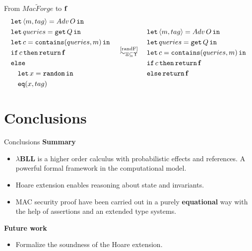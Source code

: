 \documentclass{beamer}[aspectratio=169]
\newcommand{\lamBLL}{{\lambda}\mathbf{BLL}}
\begin{document}
\begin{frame}{From \texorpdfstring{$\widetilde{MacForge}$}{MacForge} to \texorpdfstring{$\mathbf{f}$}{false}}
    \scriptsize
    \begin{align*}
    \begin{aligned}
        &\mathtt{let}\,\langle m,tag \rangle = Adv\,O\,\mathtt{in}\, \\
        &\mathtt{let}\,queries = \mathtt{get}\, Q\,\mathtt{in}\, \\
        &\mathtt{let}\,c=\mathtt{contains}(queries, m)\,\mathtt{in}\, \\
        & \mathtt{if}\, c\, \mathtt{then} \, \mathtt{return}\, \mathbf{f} \\
        &\mathtt{else} \\
        &\quad \mathtt{let}\,x = \mathtt{random}\,\mathtt{in}\, \\
        &\quad \mathtt{eq}(x,tag)
    \end{aligned}
    \quad\overset{\text{\ref{randF}}}{\sim_{\Xi\subseteq\Upsilon}}\quad
    \begin{aligned}
        &\mathtt{let}\,\langle m,tag \rangle = Adv\,O\,\mathtt{in}\, \\
        &\mathtt{let}\,queries = \mathtt{get}\, Q\,\mathtt{in}\, \\
        &\mathtt{let}\,c=\mathtt{contains}(queries, m)\,\mathtt{in}\, \\
        & \mathtt{if}\, c\, \mathtt{then} \, \mathtt{return}\, \mathbf{f} \\
        &\mathtt{else} \, \mathtt{return}\, \mathbf{f}
    \end{aligned}
    \end{align*}
\end{frame}

\section{Conclusions}

\begin{frame}{Conclusions}
\textbf{Summary}
\begin{itemize}
    \item $\lamBLL$ is a higher order calculus with probabilistic effects and references. A powerful formal framework in the computational model. 
    \item Hoare extension enables reasoning about state and invariants.
    \item MAC security proof have been carried out in a purely \textbf{equational} way with the help of assertions and an extended type systems.
\end{itemize}

\textbf{Future work}
\begin{itemize}
    \item Formalize the soundness of the Hoare extension.
\end{itemize}
\end{frame}

%     
%     
\end{document}
